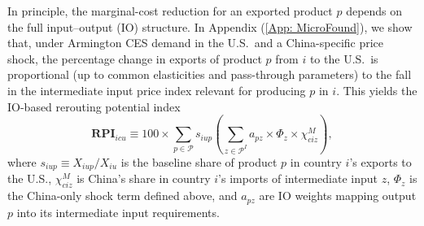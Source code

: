 \documentclass[english,12pt]{article}
\theoremstyle{definition}
\let\oldref\ref
\renewcommand{\ref}[1]{(\oldref{#1})}
\begin{document}
In principle, the marginal-cost reduction for an exported product $p$ depends
on the full input--output (IO) structure. In Appendix \ref{App: MicroFound}, we show that, under
Armington CES demand in the U.S.\ and a China-specific price shock, the
percentage change in exports of product $p$ from $i$ to the U.S.\ is
proportional (up to common elasticities and pass-through parameters) to the
fall in the intermediate input price index relevant for producing $p$ in $i$.
This yields the IO-based rerouting potential index
\begin{equation}
\boldsymbol{RPI}_{icu}\equiv 100 \times\sum_{p\in\mathcal{P}}s_{iup}\left(
\sum_{z\in\mathcal{P}^{I}}a_{pz}\times \Phi_{z}\times \chi_{ciz}^{M}\right),
\label{eq: RPI Baseline}
\end{equation}%
where $s_{iup}\equiv X_{iup}/X_{iu}$ is the baseline share of product $p$ in
country $i$'s exports to the U.S., $\chi_{ciz}^{M}$ is China's share in
country $i$'s imports of intermediate input $z$, $\Phi_{z}$ is the
China-only shock term defined above, and $a_{pz}$ are IO weights mapping
output $p$ into its intermediate input requirements.
\end{document}
